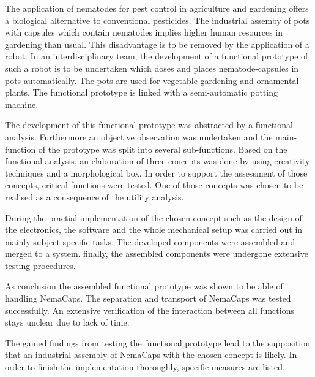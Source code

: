\newpage
The application of nematodes for pest control in agriculture and gardening offers a biological alternative to conventional pesticides. The industrial assemby of pots with capsules which contain nematodes implies higher human resources in gardening than usual. This disadvantage is to be removed by the application of a robot. In an interdisciplinary team, the development of a functional prototype of such a robot is to be undertaken which doses and places nematode-capsules in pots automatically. The pots are used for vegetable gardening and ornamental plants. The functional prototype is linked with a semi-automatic potting machine.
\newline

The development of this functional prototype was abstracted by a functional analysis. Furthermore an objective observation was undertaken and the main-function of the prototype was split into several sub-functions. Based on the functional analysis, an elaboration of three concepts was done by using creativity techniques and a morphological box. In order to support the assessment of those concepts, critical functions were tested. One of those concepts was chosen to be realised as a consequence of the utility analysis.
\newline

During the practial implementation of the chosen concept such as the design of the electronics, the software and the whole mechanical setup was carried out in mainly subject-specific tasks. The developed components were assembled and merged to a system. finally, the assembled components were undergone extensive testing procedures.
\newline

As conclusion the assembled functional prototype was shown to be able of handling NemaCaps. The separation and transport of NemaCaps was tested successfully. An extensive verification of the  interaction between all functions stays unclear due to lack of time.
\newline

The gained findings from testing the functional prototype lead to the supposition that an industrial assembly of NemaCaps with the chosen concept is likely. In order to finish the implementation thoroughly, specific measures are listed.